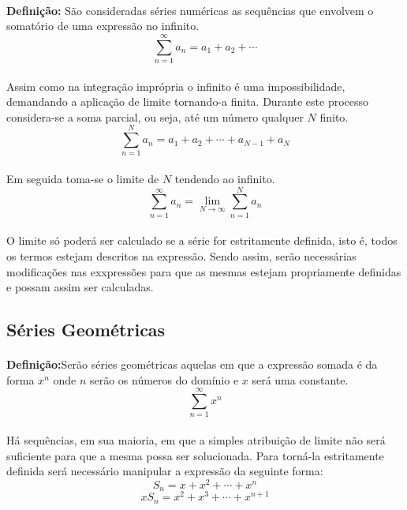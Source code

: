 \documentclass{article}
\begin{document}
\begin{enumerate}[rightmargin = \leftmargin]
        \paragraph{}\textbf{Definição:} São consideradas séries numéricas as sequências que envolvem o somatório de uma expressão no infinito.
        \[\sum\limits_{n=1}^{\infty}a_n = a_1 + a_2 + \cdots\]
        \paragraph{}Assim como na integração imprópria o infinito é uma impossibilidade, demandando a aplicação de limite tornando-a finita. Durante este processo considera-se a soma parcial, ou seja, até um número qualquer $N$ finito.
        \[\sum\limits_{n=1}^{N}a_n = a_1 + a_2 + \cdots + a_{N-1} + a_N\]
        \paragraph{}Em seguida toma-se o limite de $N$ tendendo ao infinito.
        \[\sum\limits_{n=1}^{\infty}a_n=\lim\limits_{N\to\infty}\sum\limits_{n=1}^{N}a_n\]
        \paragraph{}O limite só poderá ser calculado se a série for estritamente definida, isto é, todos os termos estejam descritos na expressão. Sendo assim, serão necessárias modificações nas exxpressões para que as mesmas estejam propriamente definidas e possam assim ser calculadas.
    
    \subsection{Séries Geométricas}
        \paragraph{}\textbf{Definição:}Serão séries geométricas aquelas em que a expressão somada é da forma $x^{n}$ onde $n$ serão os números do domínio e $x$ será uma constante.
            \[\sum\limits_{n=1}^{\infty}x^n\]
        \paragraph{}Há sequências, em sua maioria, em que a simples atribuição de limite não será suficiente para que a mesma possa ser solucionada. Para torná-la estritamente definida será necessário manipular a expressão da seguinte forma:
            \[S_n=x+x^2+\cdots+x^n\]
            \[xS_n=x^2+x^3+\cdots+x^{n+1}\]

\end{enumerate}
\end{document}
